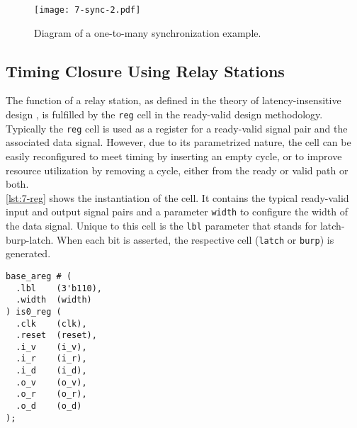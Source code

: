 \begin{figure}[H]
  \centering
  \texttt{[image: 7-sync-2.pdf]}
  \caption{Diagram of a one-to-many synchronization example.}
  \label{fig:7-sync-2}
\end{figure}



\subsection{Timing Closure Using Relay Stations}
\label{sec:burp}

The function of a relay station, as defined in the theory of latency-insensitive design \cite{delay-insensitive}, is fulfilled by the \texttt{reg} cell in the ready-valid design methodology. Typically the \texttt{reg} cell is used as a register for a ready-valid signal pair and the associated data signal. However, due to its parametrized nature, the cell can be easily reconfigured to meet timing by inserting an empty cycle, or to improve resource utilization by removing a cycle, either from the ready or valid path or both.\\
\autoref{lst:7-reg} shows the instantiation of the cell. It contains the typical ready-valid input and output signal pairs and a parameter \texttt{width} to configure the width of the data signal. Unique to this cell is the \texttt{lbl} parameter that stands for latch-burp-latch. When each bit is asserted, the respective cell (\texttt{latch} or \texttt{burp}) is generated.

\begin{lstlisting}[style={verilog-style}, caption=Ready-valid register cell from the ready-valid cell library., label=lst:7-reg]
base_areg # (
  .lbl    (3'b110),
  .width  (width)
) is0_reg (
  .clk    (clk),
  .reset  (reset),
  .i_v    (i_v),
  .i_r    (i_r),
  .i_d    (i_d),
  .o_v    (o_v),
  .o_r    (o_r),
  .o_d    (o_d)
);
\end{lstlisting}



